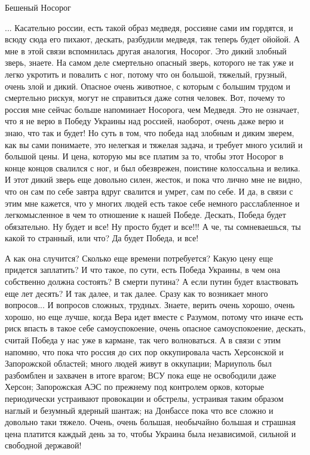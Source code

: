  
 
 
 
 

Бешеный Носорог

... Касательно россии, есть такой образ медведя, россияне сами им гордятся, и
всюду сюда его пихают, дескать, разбудили медведя, так теперь будет ойойой.  А
мне в этой связи вспомнилась другая аналогия, Носорог. Это дикий злобный зверь,
знаете.  На самом деле смертельно опасный зверь, которого не так уже и легко
укротить и повалить с ног, потому что он большой, тяжелый, грузный, очень злой
и дикий. Опасное очень животное, с которым с большим трудом и смертельно
рискуя, могут не справиться даже сотня человек.  Вот, почему то россия мне
сейчас больше напоминает Носорога, чем Медведя. Это не означает, что я не верю
в Победу Украины над россией, наоборот, очень даже верю и знаю, что так и
будет!  Но суть в том, что победа над злобным и диким зверем, как вы сами
понимаете, это нелегкая и тяжелая задача, и требует много усилий и большой
цены. И цена, которую мы все платим за то, чтобы этот Носорог в конце концов
свалился с ног, и был обезврежен, поистине колоссальна и велика. И этот дикий
зверь еще довольно силен, жесток, и пока что лично мне не видно, что он сам по
себе завтра вдруг свалится и умрет, сам по себе.  И да, в связи с этим мне
кажется, что у многих людей есть такое себе немного расслабленное и
легкомысленное в чем то отношение к нашей Победе.  Дескать, Победа будет
обязательно. Ну будет и все! Ну просто будет и все!!! А че, ты сомневаешься, ты
какой то странный, или что? Да будет Победа, и все!

А как она случится? Сколько еще времени потребуется?  Какую цену еще придется
заплатить? И что такое, по сути, есть Победа Украины, в чем она собственно
должна состоять?  В смерти путина? А если путин будет властвовать еще лет
десять? И так далее, и так далее. Сразу как то возникает много вопросов...  И
вопросов сложных, трудных.  Знаете, верить очень хорошо, очень хорошо, но еще
лучше, когда Вера идет вместе с Разумом, потому что иначе есть риск впасть в
такое себе самоуспокоение, очень опасное самоуспокоение, дескать, считай Победа
у нас уже в кармане, так чего волноваться. А в связи с этим напомню, что пока
что россия до сих пор оккупировала часть Херсонской и Запорожской областей;
много людей живут в оккупации; Мариуполь был разбомблен и захвачен в итоге
врагом; ВСУ пока еще не освободили даже Херсон; Запорожская АЭС по прежнему под
контролем орков, которые периодически устраивают провокации и обстрелы,
устраивая таким образом наглый и безумный ядерный шантаж; на Донбассе пока что
все сложно и довольно таки тяжело.  Очень, очень большая, необычайно большая и
страшная цена платится каждый день за то, чтобы Украина была независимой,
сильной и свободной державой!


